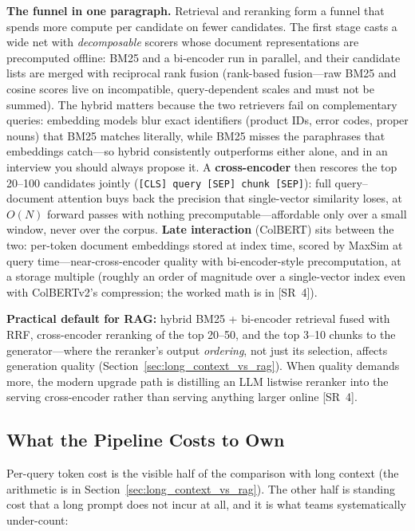 \textbf{The funnel in one paragraph.} Retrieval and reranking form a funnel that spends more compute per candidate on fewer candidates. The first stage casts a wide net with \textit{decomposable} scorers whose document representations are precomputed offline: BM25 and a bi-encoder run in parallel, and their candidate lists are merged with reciprocal rank fusion (rank-based fusion---raw BM25 and cosine scores live on incompatible, query-dependent scales and must not be summed). The hybrid matters because the two retrievers fail on complementary queries: embedding models blur exact identifiers (product IDs, error codes, proper nouns) that BM25 matches literally, while BM25 misses the paraphrases that embeddings catch---so hybrid consistently outperforms either alone, and in an interview you should always propose it. A \textbf{cross-encoder} then rescores the top 20--100 candidates jointly (\texttt{[CLS] query [SEP] chunk [SEP]}): full query--document attention buys back the precision that single-vector similarity loses, at $O(N)$ forward passes with nothing precomputable---affordable only over a small window, never over the corpus. \textbf{Late interaction} (ColBERT) sits between the two: per-token document embeddings stored at index time, scored by MaxSim at query time---near-cross-encoder quality with bi-encoder-style precomputation, at a storage multiple (roughly an order of magnitude over a single-vector index even with ColBERTv2's compression; the worked math is in [SR~4]).

\textbf{Practical default for RAG:} hybrid BM25 + bi-encoder retrieval fused with RRF, cross-encoder reranking of the top 20--50, and the top 3--10 chunks to the generator---where the reranker's output \textit{ordering}, not just its selection, affects generation quality (Section~\ref{sec:long_context_vs_rag}). When quality demands more, the modern upgrade path is distilling an LLM listwise reranker into the serving cross-encoder rather than serving anything larger online [SR~4].

\subsection{What the Pipeline Costs to Own}

Per-query token cost is the visible half of the comparison with long context (the arithmetic is in Section~\ref{sec:long_context_vs_rag}). The other half is standing cost that a long prompt does not incur at all, and it is what teams systematically under-count:

